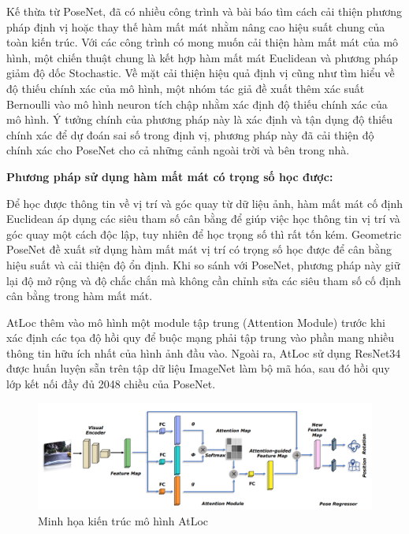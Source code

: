 Kế thừa từ PoseNet, đã có nhiều công trình và bài báo tìm cách cải thiện phương pháp định vị hoặc thay thế hàm mất mát nhằm nâng cao hiệu suất chung của toàn kiến trúc. Với các công trình có mong muốn cải thiện hàm mất mát của mô hình, một chiến thuật chung là kết hợp hàm mất mát Euclidean và phương pháp giảm độ dốc Stochastic. Về mặt cải thiện hiệu quả định vị cũng như tìm hiểu về độ thiếu chính xác của mô hình, một nhóm tác giả đề xuất thêm xác suất Bernoulli vào mô hình neuron tích chập \cite{kendall2016modelling} nhằm xác định độ thiếu chính xác của mô hình. Ý tưởng chính của phương pháp này là xác định và tận dụng độ thiếu chính xác để dự đoán sai số trong định vị, phương pháp này đã cải thiện độ chính xác cho PoseNet cho cả những cảnh ngoài trời và bên trong nhà.

\noindent\textbf{Phương pháp sử dụng hàm mất mát có trọng số học được:}

Để học được thông tin về vị trí và góc quay từ dữ liệu ảnh, hàm mất mát cố định Euclidean áp dụng các siêu tham số cân bằng để giúp việc học thông tin vị trí và góc quay một cách độc lập, tuy nhiên để học trọng số thì rất tốn kém. Geometric PoseNet \cite{kendall2017geometric} đề xuất sử dụng hàm mất mát vị trí có trọng số học được để cân bằng hiệu suất và cải thiện độ ổn định. Khi so sánh với PoseNet, phương pháp này giữ lại độ mở rộng và độ chắc chắn mà không cần chỉnh sửa các siêu tham số cố định cân bằng trong hàm mất mát.

AtLoc \cite{wang2019atloc} thêm vào mô hình một module tập trung (Attention Module) trước khi xác định các tọa độ hồi quy để  buộc mạng phải tập trung vào phần mang nhiều thông tin hữu ích nhất của hình ảnh đầu vào. Ngoài ra, AtLoc sử dụng ResNet34 được huấn luyện sẵn trên tập dữ liệu ImageNet làm bộ mã hóa, sau đó hồi quy lớp kết nối đầy đủ 2048 chiều của PoseNet.
\begin{figure}[H]
    \centering
    \includegraphics[width=\textwidth]{pics/Chapter2/atloc.png}
    \caption{Minh họa kiến trúc mô hình AtLoc \cite{wang2019atloc}}
\end{figure}

